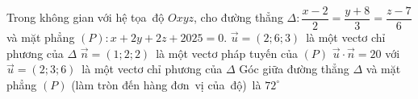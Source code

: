 \begin{ex}%
	Trong không gian  với hệ tọa~độ $Oxyz$, cho đường thẳng $\Delta\colon \dfrac{x-2}{2}=\dfrac{y+8}{3}=\dfrac{z-7}{6}$ và mặt phẳng $(P)\colon x + 2y+ 2z + 2025 = 0$.
	\choiceTF 
		{$\overrightarrow{u}=(2; 6;  3)$~là một vectơ chỉ phương của $\Delta$}
		{\True$\overrightarrow{n}=(1; 2;  2)$~là một vectơ pháp tuyến của $(P)$}
		{\True $\overrightarrow{u}\cdot \overrightarrow{n}=20$ với $\overrightarrow{u}=(2; 3; 6)$~là một vectơ  chỉ phương của $\Delta$}
		{\True Góc giữa đường  thẳng $\Delta$ và mặt phẳng $(P)$ (làm tròn đến hàng đơn~vị của~độ)~là $72^\circ$}
\end{ex}

